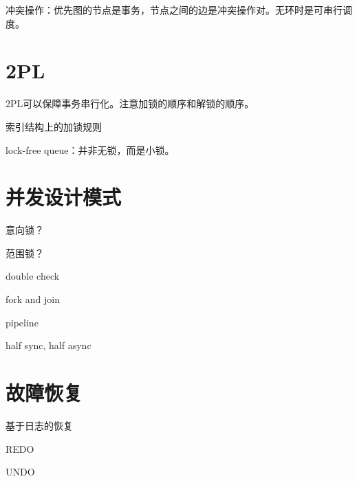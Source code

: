 冲突操作：优先图的节点是事务，节点之间的边是冲突操作对。无环时是可串行调度。

\section{2PL}

2PL可以保障事务串行化。注意加锁的顺序和解锁的顺序。

索引结构上的加锁规则

lock-free queue：并非无锁，而是小锁。

\section{并发设计模式}

意向锁？

范围锁？

\begin{compactitem}
    \item double check
    \item fork and join
    \item pipeline
    \item half sync, half async
\end{compactitem}

\section{故障恢复}

基于日志的恢复

REDO

UNDO

